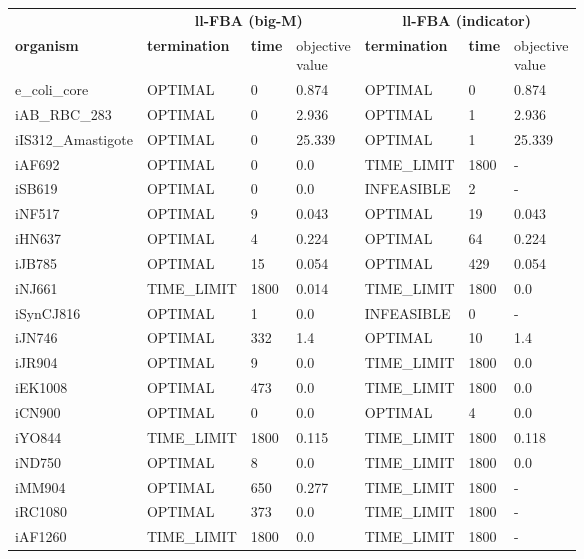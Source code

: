 \begin{table}[!ht]
    \small
    \centering
    \begin{tabular}{@{\extracolsep{4pt}}lllllll@{}}
    \hline
        \multicolumn{1}{c}{} & \multicolumn{3}{c}{\textbf{ll-FBA (big-M)}} & \multicolumn{3}{c}{\textbf{ll-FBA (indicator)}}\\ \cline{2-4} \cline{5-7} 
        \textbf{organism} & \textbf{termination} & \textbf{time} & \thead{objective \\value} & \textbf{termination} & \textbf{time} & \thead{objective \\value} \\ \hline
        e\_coli\_core & OPTIMAL & 0 & 0.874 & OPTIMAL & 0 & 0.874 \\ 
        iAB\_RBC\_283 & OPTIMAL & 0 & 2.936 & OPTIMAL & 1 & 2.936 \\ 
        iIS312\_Amastigote & OPTIMAL & 0 & 25.339 & OPTIMAL & 1 & 25.339 \\ 
        iAF692 & OPTIMAL & 0 & 0.0 & TIME\_LIMIT & 1800 & - \\ 
        iSB619 & OPTIMAL & 0 & 0.0 & INFEASIBLE & 2 & - \\ 
        iNF517 & OPTIMAL & 9 & 0.043 & OPTIMAL & 19 & 0.043 \\ 
        iHN637 & OPTIMAL & 4 & 0.224 & OPTIMAL & 64 & 0.224 \\ 
        iJB785 & OPTIMAL & 15 & 0.054 & OPTIMAL & 429 & 0.054 \\ 
        iNJ661 & TIME\_LIMIT & 1800 & 0.014 & TIME\_LIMIT & 1800 & 0.0 \\ 
        iSynCJ816 & OPTIMAL & 1 & 0.0 & INFEASIBLE & 0 & - \\ 
        iJN746 & OPTIMAL & 332 & 1.4 & OPTIMAL & 10 & 1.4 \\ 
        iJR904 & OPTIMAL & 9 & 0.0 & TIME\_LIMIT & 1800 & 0.0 \\ 
        iEK1008 & OPTIMAL & 473 & 0.0 & TIME\_LIMIT & 1800 & 0.0 \\ 
        iCN900 & OPTIMAL & 0 & 0.0 & OPTIMAL & 4 & 0.0 \\ 
        iYO844 & TIME\_LIMIT & 1800 & 0.115 & TIME\_LIMIT & 1800 & 0.118 \\ 
        iND750 & OPTIMAL & 8 & 0.0 & TIME\_LIMIT & 1800 & 0.0 \\ 
        iMM904 & OPTIMAL & 650 & 0.277 & TIME\_LIMIT & 1800 & - \\ 
        iRC1080 & OPTIMAL & 373 & 0.0 & TIME\_LIMIT & 1800 & - \\ 
        iAF1260 & TIME\_LIMIT & 1800 & 0.0 & TIME\_LIMIT & 1800 & - \\ 

\end{tabular}
\end{table}
